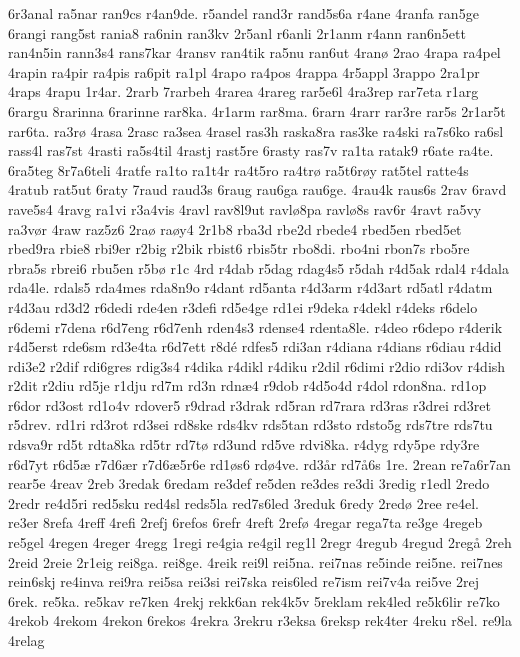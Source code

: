 6r3anal
ra5nar
ran9cs
r4an9de.
r5andel
rand3r
rand5s6a
r4ane
4ranfa
ran5ge
6rangi
rang5st
rania8
ra6nin
ran3kv
2r5anl
r6anli
2r1anm
r4ann
ran6n5ett
ran4n5in
rann3s4
rans7kar
4ransv
ran4tik
ra5nu
ran6ut
4ran^^f8
2rao
4rapa
ra4pel
4rapin
ra4pir
ra4pis
ra6pit
ra1pl
4rapo
ra4pos
4rappa
4r5appl
3rappo
2ra1pr
4raps
4rapu
1r4ar.
2rarb
7rarbeh
4rarea
4rareg
rar5e6l
4ra3rep
rar7eta
r1arg
6rargu
8rarinna
6rarinne
rar8ka.
4r1arm
rar8ma.
6rarn
4rarr
rar3re
rar5s
2r1ar5t
rar6ta.
ra3r^^f8
4rasa
2rasc
ra3sea
4rasel
ras3h
raska8ra
ras3ke
ra4ski
ra7s6ko
ra6sl
rass4l
ras7st
4rasti
ra5s4til
4rastj
rast5re
6rasty
ras7v
ra1ta
ratak9
r6ate
ra4te.
6ra5teg
8r7a6teli
4ratfe
ra1to
ra1t4r
ra4t5ro
ra4tr^^f8
ra5t6r^^f8y
rat5tel
ratte4s
4ratub
rat5ut
6raty
7raud
raud3s
6raug
rau6ga
rau6ge.
4rau4k
raus6s
2rav
6ravd
rave5s4
4ravg
ra1vi
r3a4vis
4ravl
rav8l9ut
ravl^^f88pa
ravl^^f88s
rav6r
4ravt
ra5vy
ra3v^^f8r
4raw
raz5z6
2ra^^f8
ra^^f8y4
2r1b8
rba3d
rbe2d
rbede4
rbed5en
rbed5et
rbed9ra
rbie8
rbi9er
r2big
r2bik
rbist6
rbis5tr
rbo8di.
rbo4ni
rbon7s
rbo5re
rbra5s
rbrei6
rbu5en
r5b^^f8
r1c
4rd
r4dab
r5dag
rdag4s5
r5dah
r4d5ak
rdal4
r4dala
rda4le.
rdals5
rda4mes
rda8n9o
r4dant
rd5anta
r4d3arm
r4d3art
rd5atl
r4datm
r4d3au
rd3d2
r6dedi
rde4en
r3defi
rd5e4ge
rd1ei
r9deka
r4dekl
r4deks
r6delo
r6demi
r7dena
r6d7eng
r6d7enh
rden4s3
rdense4
rdenta8le.
r4deo
r6depo
r4derik
r4d5erst
rde6sm
rd3e4ta
r6d7ett
r8d^^e9
rdfes5
rdi3an
r4diana
r4dians
r6diau
r4did
rdi3e2
r2dif
rdi6gres
rdig3s4
r4dika
r4dikl
r4diku
r2dil
r6dimi
r2dio
rdi3ov
r4dish
r2dit
r2diu
rd5je
r1dju
rd7m
rd3n
rdn^^e64
r9dob
r4d5o4d
r4dol
rdon8na.
rd1op
r6dor
rd3ost
rd1o4v
rdover5
r9drad
r3drak
rd5ran
rd7rara
rd3ras
r3drei
rd3ret
r5drev.
rd1ri
rd3rot
rd3sei
rd8ske
rds4kv
rds5tan
rd3sto
rdsto5g
rds7tre
rds7tu
rdsva9r
rd5t
rdta8ka
rd5tr
rd7t^^f8
rd3und
rd5ve
rdvi8ka.
r4dyg
rdy5pe
rdy3re
r6d7yt
r6d5^^e6
r7d6^^e6r
r7d6^^e65r6e
rd1^^f8s6
rd^^f84ve.
rd3^^e5r
rd7^^e56s
1re.
2rean
re7a6r7an
rear5e
4reav
2reb
3redak
6redam
re3def
re5den
re3des
re3di
3redig
r1edl
2redo
2redr
re4d5ri
red5sku
red4sl
reds5la
red7s6led
3reduk
6redy
2red^^f8
2ree
re4el.
re3er
8refa
4reff
4refi
2refj
6refos
6refr
4reft
2ref^^f8
4regar
rega7ta
re3ge
4regeb
re5gel
4regen
4reger
4regg
1regi
re4gia
re4gil
reg1l
2regr
4regub
4regud
2reg^^e5
2reh
2reid
2reie
2r1eig
rei8ga.
rei8ge.
4reik
rei9l
rei5na.
rei7nas
re5inde
rei5ne.
rei7nes
rein6skj
re4inva
rei9ra
rei5sa
rei3si
rei7ska
reis6led
re7ism
rei7v4a
rei5ve
2rej
6rek.
re5ka.
re5kav
re7ken
4rekj
rekk6an
rek4k5v
5reklam
rek4led
re5k6lir
re7ko
4rekob
4rekom
4rekon
6rekos
4rekra
3rekru
r3eksa
6reksp
rek4ter
4reku
r8el.
re9la
4relag
